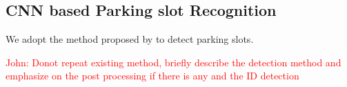 \documentclass[journal]{IEEEtran}
\newcommand{\COMMENT}[1]{\textcolor{red}{#1}}
\begin{document}
\subsection{CNN based Parking slot Recognition}

We adopt the method proposed by \citep{Li2017Vision} to detect parking slots.
%

\COMMENT{John: Donot repeat existing method, briefly describe the detection method and emphasize on the post processing if there is any and the ID detection}


%
\end{document}
